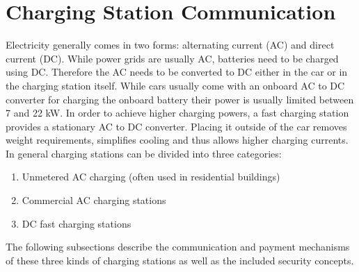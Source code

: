 \documentclass[conference,flushend]{iaria} %
\begin{document}
\section{Charging Station Communication}
Electricity generally comes in two forms: alternating current (AC) and direct current (DC).
While power grids are usually AC, batteries need to be charged using DC.
Therefore the AC needs to be converted to DC either in the car or in the charging station itself.
While cars usually come with an onboard AC to DC converter for charging the onboard battery their power is usually limited between 7 and 22 kW.
In order to achieve higher charging powers, a fast charging station provides a stationary AC to DC converter. Placing it outside of the car removes weight requirements, simplifies cooling and thus allows higher charging currents. \\
In general charging stations can be divided into three categories:
\begin{enumerate}
\item Unmetered AC charging (often used in residential buildings)
\item Commercial AC charging stations
\item DC fast charging stations
\end{enumerate}%
%
The following subsections describe the communication and payment mechanisms of these three kinds of charging stations as well as the included security concepts.
\end{document}
